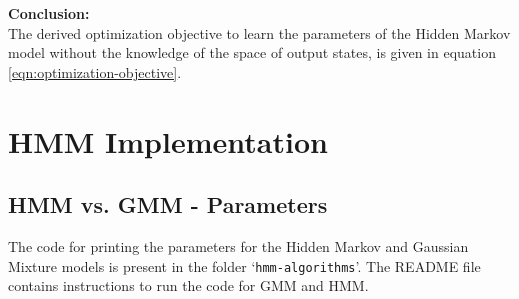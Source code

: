 \documentclass[parskip=half]{scrartcl}
\begin{document}
    \textbf{Conclusion:}\\
    The derived optimization objective to learn the parameters of the Hidden Markov model without the knowledge of the space of output states, is given in equation \ref{eqn:optimization-objective}.




\newpage


\section{HMM Implementation} %
\label{sec:hmm_implementation}


    \subsection{HMM vs. GMM - Parameters} %
    \label{sub:hmm_vs_gmm_parameters}

        The code for printing the parameters for the Hidden Markov and Gaussian Mixture models is present in the folder `\texttt{hmm-algorithms}'. The README file contains instructions to run the code for GMM and HMM.
\end{document}
